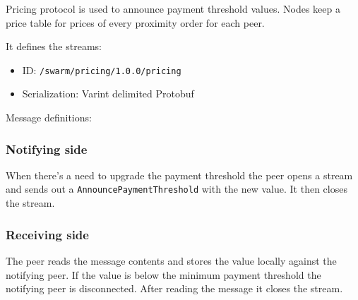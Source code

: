 Pricing protocol is used to announce payment threshold values. Nodes
keep a price table for prices of every proximity order for each peer.

It defines the streams:
\begin{itemize}
    \item ID: \texttt{/swarm/pricing/1.0.0/pricing}
    \item Serialization: Varint delimited Protobuf
\end{itemize}

Message definitions:

\begin{Shaded}
\begin{Highlighting}[]
\NormalTok{;}


 \NormalTok{;}
\NormalTok{\}}
\end{Highlighting}
\end{Shaded}

\subsubsection{Notifying side}\label{notifying-side}

When there's a need to upgrade the payment threshold the peer opens a
stream and sends out a \texttt{AnnouncePaymentThreshold} with the new
value. It then closes the stream.

\subsubsection{Receiving side}\label{receiving-side-1}

The peer reads the message contents and stores the value locally against
the notifying peer. If the value is below the minimum payment threshold
the notifying peer is disconnected. After reading the message it closes
the stream.